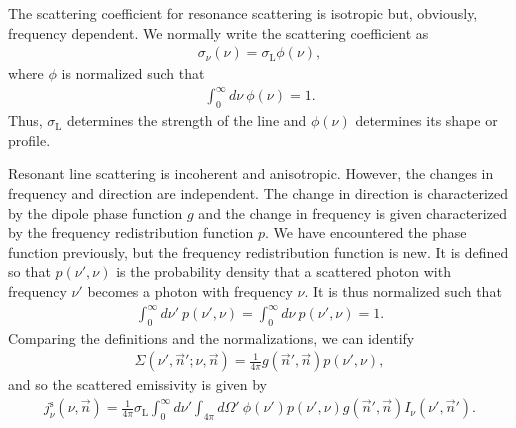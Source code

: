 The scattering coefficient for resonance scattering is
isotropic but, obviously, frequency dependent. We normally
write the scattering coefficient as
\begin{align}
\sigma_\nu(\nu) = \sigma_\mathrm{L}\phi(\nu),
\end{align}
where $\phi$ is normalized such that
\begin{align}
\int_0^\infty\!\!\!d\nu\:\phi(\nu) = 1.
\end{align}
Thus, $\sigma_\mathrm{L}$ determines the strength of the
line and $\phi(\nu)$ determines its shape or
profile.

Resonant line scattering is incoherent and anisotropic.
However, the changes in frequency and direction are
independent. The change in direction is characterized by the
dipole phase function $g$ and the change in frequency is
given characterized by the frequency redistribution function
$p$. We have encountered the phase function previously, but
the frequency redistribution function is new. It is defined
so that $p(\nu',\nu)$ is the probability density that a
scattered photon with frequency $\nu'$ becomes a photon with
frequency $\nu$. It is thus normalized such that
\begin{align}
\int_0^\infty\!\!\!d\nu'\:p(\nu',\nu) =
\int_0^\infty\!\!\!d\nu\:p(\nu',\nu) =
1.
\end{align}
Comparing the definitions and the normalizations, we can
identify
\begin{align}
\Sigma(\nu', \vec n'; \nu, \vec n)
= 
\frac{1}{4\pi}
g(\vec n', \vec n)
p(\nu',\nu),
\end{align}
and so the scattered emissivity is given by
\begin{align}
j_\nu^\mathrm{s}(\nu, \vec n) = 
\frac{1}{4\pi}
\sigma_\mathrm{L}
\int_0^\infty \!\!\! d\nu' 
\int_{4\pi} \!\!\! d\Omega'
\:
\phi(\nu')
p(\nu',\nu)
g(\vec n', \vec n)
I_\nu(\nu', \vec n').
\end{align}

